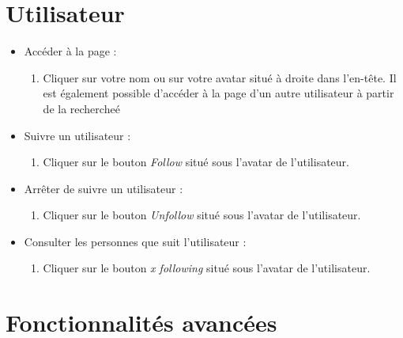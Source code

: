 \documentclass[12pt, letterpaper]{article}
\begin{document}
    \section*{Utilisateur}
    \begin{itemize}
        \item Accéder à la page :
        \begin{enumerate}
            \item Cliquer sur votre nom ou sur votre avatar situé à droite dans l'en-tête. Il est également possible d'accéder à la page d'un autre utilisateur à partir de la rechercheé
        \end{enumerate}

        \item Suivre un utilisateur :
        \begin{enumerate}
            \item Cliquer sur le bouton \textit{Follow} situé sous l'avatar de l'utilisateur.
        \end{enumerate}

        \item Arrêter de suivre un utilisateur :
        \begin{enumerate}
            \item Cliquer sur le bouton \textit{Unfollow} situé sous l'avatar de l'utilisateur.
        \end{enumerate}

        \item Consulter les personnes que suit l'utilisateur :
        \begin{enumerate}
            \item Cliquer sur le bouton \textit{x following} situé sous l'avatar de l'utilisateur.
        \end{enumerate}
    \end{itemize}

    \section*{Fonctionnalités avancées}
\end{document}

